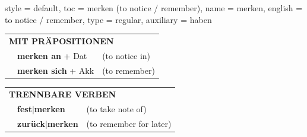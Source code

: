 \begin{verbentry}{
  style = {default},
  toc = {merken (to notice / remember)},
  name = {merken},
  english = {to notice / remember},
  type = {regular},
  auxiliary = {haben}
}
\vspace{10pt}

\begin{tabular}{lll}
\multicolumn{3}{l}{\textbf{MIT PRÄPOSITIONEN}}\\
& \textbf{merken an} + Dat & (to notice in)\\
& \textbf{merken sich} + Akk & (to remember)\\
\end{tabular}
\hfill
\begin{tabular}{lll}
\multicolumn{3}{l}{\textbf{TRENNBARE VERBEN}}\\
& \textbf{fest$|$merken} & (to take note of)\\
& \textbf{zurück$|$merken} & (to remember for later)\\
\end{tabular}
\vspace{-5pt}
\end{verbentry}


